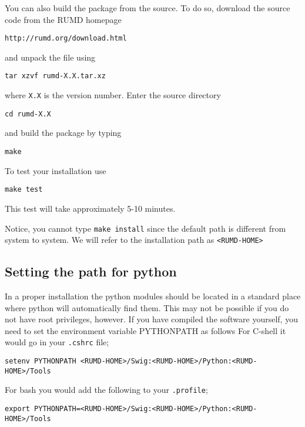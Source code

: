 You can also build the package from the source. To do so, download the
source code from the RUMD homepage 
\begin{verbatim}
http://rumd.org/download.html
\end{verbatim}
and unpack the file using
\begin{verbatim}
tar xzvf rumd-X.X.tar.xz
\end{verbatim}
where \verb|X.X| is the version number. Enter the source directory 
\begin{verbatim}
cd rumd-X.X
\end{verbatim}
and build the package by typing 
\begin{verbatim}
make
\end{verbatim}
To test your installation use
\begin{verbatim}
make test
\end{verbatim}
This test will take approximately 5-10 minutes.

Notice, you cannot type \verb=make install= since the default path is 
different from system to system. We will refer to the installation
path as \verb=<RUMD-HOME>=  


\subsection{Setting the path for python}

In a proper installation the python  modules should be located in a standard
place where python will automatically find them. This may not be possible if
you do not have root privileges, however. If you have compiled the software
yourself, you need to set the environment variable PYTHONPATH as follows 
For C-shell it would go in your \verb|.cshrc| file; 

\noindent \verb|setenv PYTHONPATH <RUMD-HOME>/Swig:<RUMD-HOME>/Python:<RUMD-HOME>/Tools|

For bash you would add the following to your \verb|.profile|;

\noindent \verb|export PYTHONPATH=<RUMD-HOME>/Swig:<RUMD-HOME>/Python:<RUMD-HOME>/Tools|

\clearpage

%

